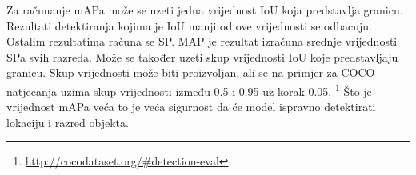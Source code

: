 Za računanje mAPa može se uzeti jedna vrijednost IoU koja predstavlja granicu. Rezultati detektiranja kojima je IoU manji od ove vrijednosti se odbacuju.
Ostalim rezultatima računa se SP. MAP je rezultat izračuna srednje vrijednosti SPa svih razreda. Može se također uzeti skup vrijednosti IoU koje predstavljaju granicu. 
Skup vrijednosti može biti proizvoljan, ali se na primjer za COCO natjecanja uzima skup vrijednosti između 0.5 i 0.95 uz korak 0.05. \footnote{\url{http://cocodataset.org/\#detection-eval}}
Što je vrijednost mAPa veća to je veća sigurnost da će model ispravno detektirati lokaciju i razred objekta. 